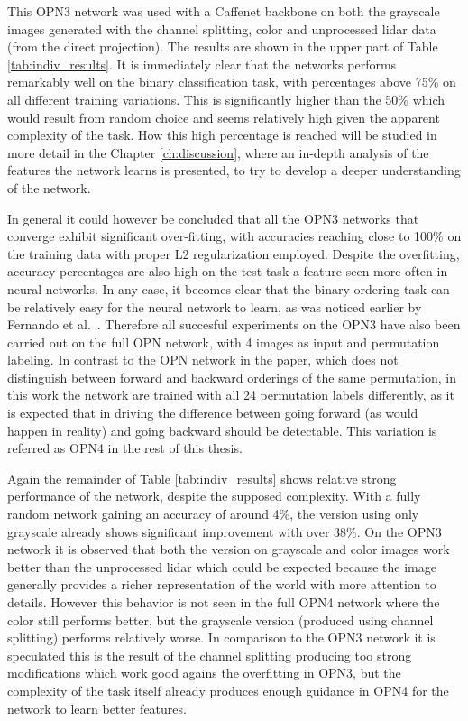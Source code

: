 This OPN3 network was used with a Caffenet backbone on both the grayscale images generated with the channel splitting, color and unprocessed lidar data (from the direct projection). The results are shown in the upper part of Table \ref{tab:indiv_results}. It is immediately clear that the networks performs remarkably well on the binary classification task, with percentages above 75\% on all different training variations. This is significantly higher than the 50\% which would result from random choice and seems relatively high given the apparent complexity of the task. How this high percentage is reached will be studied in more detail in the Chapter \ref{ch:discussion}, where an in-depth analysis of the features the network learns is presented, to try to develop a deeper understanding of the network. 

In general it could however be concluded that all the OPN3 networks that converge exhibit significant over-fitting, with accuracies reaching close to 100\% on the training data with proper L2 regularization employed. Despite the overfitting, accuracy percentages are also high on the test task a feature seen more often in neural networks. In any case, it becomes clear that the binary ordering task can be relatively easy for the neural network to learn, as was noticed earlier by Fernando et al.~\cite{fernando2017}. Therefore all succesful experiments on the OPN3 have also been carried out on the full OPN network\cite{lee2017}, with 4 images as input and permutation labeling. In contrast to the OPN network in the paper, which does not distinguish between forward and backward orderings of the same permutation, in this work the network are trained with all 24 permutation labels differently, as it is expected that in driving the difference between going forward (as would happen in reality) and going backward should be detectable. This variation is referred as OPN4 in the rest of this thesis.

Again the remainder of Table \ref{tab:indiv_results} shows relative strong performance of the network, despite the supposed complexity. With a fully random network gaining an accuracy of around 4\%, the version using only grayscale already shows significant improvement with over 38\%. On the OPN3 network it is observed that both the version on grayscale and color images work better than the unprocessed lidar which could be expected because the image generally provides a richer representation of the world with more attention to details. However this behavior is not seen in the full OPN4 network where the color still performs better, but the grayscale version (produced using channel splitting) performs relatively worse. In comparison to the OPN3 network it is speculated this is the result of the channel splitting producing too strong modifications which work good agains the overfitting in OPN3, but the complexity of the task itself already produces enough guidance in OPN4 for the network to learn better features. 

